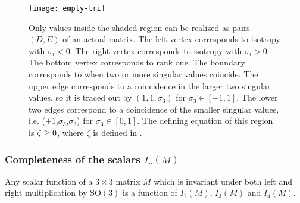 \begin{figure}
\begin{centering}
\texttt{[image: empty-tri]}
\par\end{centering}
\caption{\label{fig:DE-triangle}Only values inside the shaded region can be realized as pairs $(D,E)$ of an actual matrix. The left vertex corresponds to isotropy with $\sigma_{i}<0$. The right vertex corresponds to isotropy with $\sigma_{i}>0$. The bottom vertex corresponds to rank one. The boundary corresponds to when two or more singular values coincide. The upper edge corresponds to a coincidence in the larger two singular values, so it is traced out by $(1,1,\sigma_{3})$ for $\sigma_{3}\in\left[-1,1\right]$. The lower two edges correspond to a coincidence of the smaller singular values, i.e. ($\pm1$,$\sigma_{3}$,$\sigma_{3}$) for $\sigma_{3}\in\left[0,1\right]$. The defining equation of this region is $\zeta\protect\geq0$, where $\zeta$ is defined in .}
\end{figure}


\subsubsection*{Completeness of the scalars $I_{n}(M)$}
\begin{thm}
\label{thm:invariant-scalars}Any scalar function of a $3\times3$ matrix $M$ which is invariant under both left and right multiplication by $\mathrm{SO}(3)$ is a function of $I_{2}(M)$, $I_{3}(M)$ and $I_{4}(M)$. 
\end{thm}

